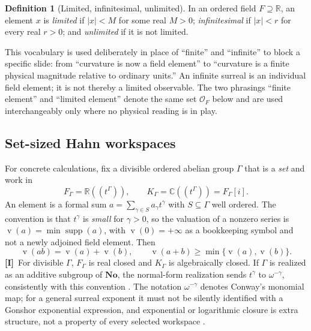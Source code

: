 \documentclass[11pt,letterpaper]{article}
\numberwithin{equation}{section}
\theoremstyle{definition}
\newtheorem{definition}[theorem]{Definition}
\theoremstyle{remark}
\newcommand{\No}{\mathbf{No}}
\newcommand{\R}{\mathbb R}
\newcommand{\C}{\mathbb C}
\newcommand{\Ofin}{\mathcal O}
\DeclareMathOperator{\supp}{supp}
\DeclareMathOperator{\val}{v}
\newcommand{\abs}[1]{\lvert#1\rvert}
\newcommand{\TI}{\textcolor{TierI}{\textsf{\bfseries[I]}}}
\begin{document}
\begin{definition}[Limited, infinitesimal, unlimited]
\label{phys:def:limited}
In an ordered field $F\supseteq\R$, an element $x$ is \emph{limited} if
$\abs x<M$ for some real $M>0$; \emph{infinitesimal} if $\abs x<r$ for every
real $r>0$; and \emph{unlimited} if it is not limited.
\end{definition}

This vocabulary is used deliberately in place of ``finite'' and ``infinite''
to block a specific slide: from ``curvature is now a field element'' to
``curvature is a finite physical magnitude relative to ordinary units.'' An
infinite surreal is an individual field element; it is not thereby a limited
observable. The two phrasings ``finite element'' and ``limited element'' denote
the same set $\Ofin_{F}$ below and are used interchangeably only where no
physical reading is in play.

\subsection{Set-sized Hahn workspaces}
\label{phys:sub:workspace}

For concrete calculations, fix a divisible ordered abelian group $\Gamma$ that
is a \emph{set} and work in
\begin{equation}\label{phys:eq:hahn}
F_{\Gamma}=\R((t^{\Gamma})),\qquad
K_{\Gamma}=\C((t^{\Gamma}))=F_{\Gamma}[i].
\end{equation}
An element is a formal sum $a=\sum_{\gamma\in S}a_{\gamma}t^{\gamma}$ with
$S\subseteq\Gamma$ well ordered. The convention is that $t^{\gamma}$ is
\emph{small} for $\gamma>0$, so the valuation of a nonzero series is
$\val(a)=\min\supp(a)$, with $\val(0)=+\infty$ as a bookkeeping symbol and not
a newly adjoined field element. Then
\begin{equation}\label{phys:eq:valrules}
\val(ab)=\val(a)+\val(b),\qquad
\val(a+b)\ge\min\{\val(a),\val(b)\}.
\end{equation}
\TI\ For divisible $\Gamma$, $F_{\Gamma}$ is real closed and $K_{\Gamma}$ is
algebraically closed. If $\Gamma$ is realized as an additive subgroup of
$\No$, the normal-form realization sends $t^{\gamma}$ to $\omega^{-\gamma}$,
consistently with this convention
\cite{phys:BM,phys:EK,phys:Conway,phys:Gonshor}. The notation
$\omega^{-\gamma}$ denotes Conway's monomial map; for a general surreal
exponent it must not be silently identified with a Gonshor exponential
expression, and exponential or logarithmic closure is extra structure, not a
property of every selected workspace \cite{phys:vdDE,phys:EK}.
\end{document}
